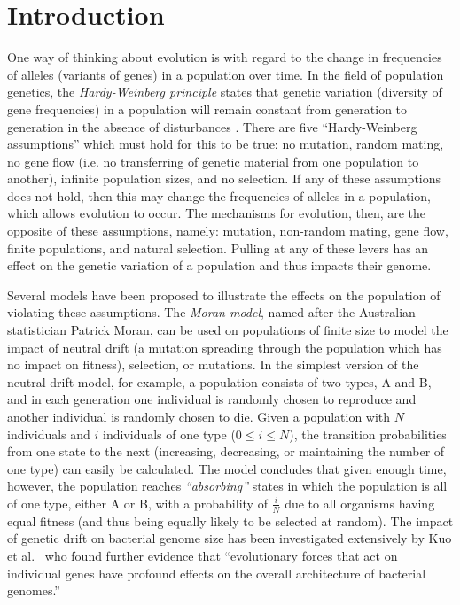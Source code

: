 \chapter{Introduction}\label{ch:01intro}

One way of thinking about evolution is with regard to the change in frequencies of alleles (variants of genes) in a population over time. In the field of population genetics, the \textit{Hardy-Weinberg principle} states that genetic variation (diversity of gene frequencies) in a population will remain constant from generation to generation in the absence of disturbances \cite{cutter2019primer}. There are five ``Hardy-Weinberg assumptions'' which must hold for this to be true: no mutation, random mating, no gene flow (i.e. no transferring of genetic material from one population to another), infinite population sizes, and no selection. If any of these assumptions does not hold, then this may change the frequencies of alleles in a population, which allows evolution to occur. The mechanisms for evolution, then, are the opposite of these assumptions, namely: mutation, non-random mating, gene flow, finite populations, and natural selection. Pulling at any of these levers has an effect on the genetic variation of a population and thus impacts their genome. 

Several models have been proposed to illustrate the effects on the population of violating these assumptions. The \textit{Moran model}, named after the Australian statistician Patrick Moran, can be used on populations of finite size to model the impact of neutral drift (a mutation spreading through the population which has no impact on fitness), selection, or mutations. In the simplest version of the neutral drift model, for example, a population consists of two types, A and B, and in each generation one individual is randomly chosen to reproduce and another individual is randomly chosen to die. Given a population with $N$ individuals and $i$ individuals of one type ($0 \leq i \leq N$), the transition probabilities from one state to the next (increasing, decreasing, or maintaining the number of one type) can easily be calculated. The model concludes that given enough time, however, the population reaches \textit{``absorbing''} states in which the population is all of one type, either A or B, with a probability of $\frac{i}{N}$ due to all organisms having equal fitness (and thus being equally likely to be selected at random). The impact of genetic drift on bacterial genome size has been investigated extensively by Kuo et al.~\cite{kuo2009consequences} who found further evidence that ``evolutionary forces that act on individual genes have profound effects on the overall architecture of bacterial genomes.'' 

